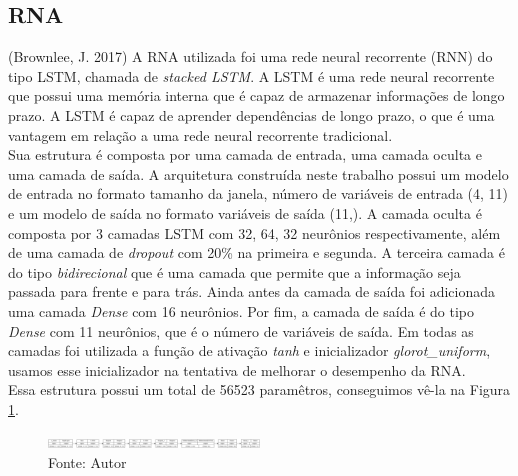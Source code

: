 \documentclass[
	article,			%
	12pt,				%
	a4paper,			%
	chapter=TITLE,		%
	section=TITLE,		%
	subsection=TITLE,	%
	subsubsection=TITLE %
	english,			%
	brazil,				%
	sumario=tradicional
	]{abntex2}
\begin{document}
\subsection{RNA}
(Brownlee, J. 2017) A RNA utilizada foi uma rede neural recorrente (RNN) do tipo LSTM, chamada de \textit{stacked LSTM}. A LSTM é uma rede neural recorrente que possui uma memória interna que é capaz de armazenar informações de longo prazo. A LSTM é capaz de aprender dependências de longo prazo, o que é uma vantagem em relação a uma rede neural recorrente tradicional.
\\ \indent
Sua estrutura é composta por uma camada de entrada, uma camada oculta e uma camada de saída. A arquitetura construída neste trabalho possui um modelo de entrada no formato tamanho da janela, número de variáveis de entrada (4, 11) e um modelo de saída no formato variáveis de saída (11,). A camada oculta é composta por 3 camadas LSTM com 32, 64, 32 neurônios respectivamente, além de uma camada de \textit{dropout} com 20\% na primeira e segunda. A terceira camada é do tipo \textit{bidirecional} que é uma camada que permite que a informação seja passada para frente e para trás. Ainda antes da camada de saída foi adicionada uma camada \textit{Dense} com 16 neurônios. Por fim, a camada de saída é do tipo \textit{Dense} com 11 neurônios, que é o número de variáveis de saída. Em todas as camadas foi utilizada a função de ativação \textit{tanh} e inicializador \textit{glorot\_uniform}, usamos esse inicializador na tentativa de melhorar o desempenho da RNA. 
\\ \indent
Essa estrutura possui um total de 56523 paramêtros, conseguimos vê-la na Figura \ref{figure3}.
\begin{figure}[htbp]
	\centering
	\includegraphics[width=0.5\textwidth]{imagens/imgCodigos/melhorLSTM.png}
	\caption{Fonte: Autor}
	\label{figure3}
\end{figure}
\end{document}
